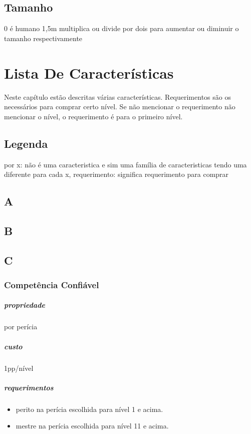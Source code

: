 \section{Tamanho} 
0 é humano 1,5m multiplica ou divide por dois para aumentar ou diminuir o tamanho respectivamente
\chapter{Lista De Características}
Neste capítulo estão descritas várias características.
Requerimentos são os necessários para comprar certo nível.
Se não mencionar o requerimento não mencionar o nível,
o requerimento é para o primeiro nível.
\section{Legenda}
por x: 
  não é uma caracteristica e sim uma família de caracteristicas tendo uma diferente para cada x,
requerimento: significa requerimento para comprar
\section{A}
\section{B}
\section{C}
\subsection{Competência Confiável}
\paragraph{propriedade} por perícia
\paragraph{custo} 1pp/nível
\paragraph{requerimentos}
\begin{itemize}
  \item perito na perícia escolhida para nível 1 e acima.
  \item mestre na perícia escolhida para nível 11 e acima.
\end{itemize}
